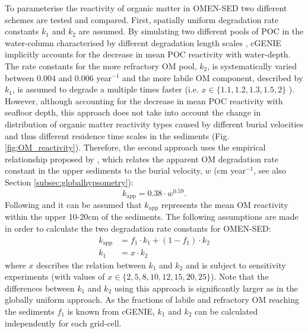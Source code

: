 \documentclass[gmd, manuscript]{copernicus}
\begin{document}
To parameterise the reactivity of organic matter in OMEN-SED two different schemes are tested and compared. First, spatially uniform degradation rate constants $k_1$ and $k_2$ are assumed. 
By simulating two different pools of POC in the water-column characterised by different degradation length scales \citep{ridgwell_marine_2007}, cGENIE implicitly accounts for the decrease in mean POC reactivity with water-depth. 
The rate constants for the more refractory OM pool, $k_2$, is systematically varied between 0.004 and 0.006 year$^{-1}$ and the more labile OM component, described by $k_1$, is assumed to degrade a multiple times faster 
(i.e. $x \in \{1.1, 1.2, 1.3, 1.5, 2\}$ ). 
However, although accounting for the decrease in mean POC reactivity with seafloor depth, this approach does not take into account the change in distribution of organic matter reactivity types caused by different burial velocities 
and thus different residence time scales in the sediments (Fig. \ref{fig:OM_reactivity}). Therefore, the second approach uses the empirical relationship proposed by \citet{boudreau1997diagenetic}, 
which relates the apparent OM degradation rate constant in the upper sediments to the burial velocity, $w$ (cm year$^{-1}$, see also Section \ref{subsec:globalhypsometry}):
\begin{equation}
 k_\mathrm{app} = 0.38 \cdot w^{0.59}.
\end{equation}
Following \citet{boudreau1997diagenetic} and \citet{stolpovsky_toward_2015} it can be assumed that $k_\mathrm{app}$ represents the mean OM reactivity within the upper 10-20cm of the sediments. 
The following assumptions are made in order to calculate the two degradation rate constants for OMEN-SED:
\begin{align}
  k_\mathrm{app} &= f_1 \cdot k_1 + (1-f_1) \cdot k_2 \label{boudreau_assumption1}\\
  k_1 &= x \cdot k_2					\label{boudreau_assumption2}
\end{align}
where $x$ describes the relation between $k_1$ and $k_2$ and is subject to sensitivity experiments (with values of $x \in \{2, 5, 8, 10, 12, 15, 20, 25\}$). 
Note that the differences between  $k_1$ and $k_2$ using this approach is significantly larger as in the globally uniform approach. 
As the fractions of labile and refractory OM reaching the sediments $f_1$ is known from cGENIE, $k_1$ and $k_2$ can be calculated independently for each grid-cell. 
\end{document}
